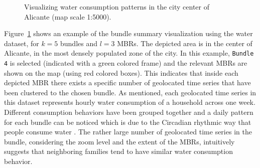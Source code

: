 \begin{figure}[ht]
 \centering
 \caption{Visualizing water consumption patterns in the city center of Alicante (map scale 1:5000).}
 \label{fig:alicante_example}
\end{figure}

Figure~\ref{fig:alicante_example} shows an example of the bundle summary visualization using the water dataset, for $k=5$ bundles and $l=3$ MBRs. The depicted area is in the center of Alicante, in the most densely populated zone of the city. In this example, \texttt{Bundle 4} is selected (indicated with a green colored frame) and the relevant MBRs are shown on the map (using red colored boxes). This indicates that inside each depicted MBR there exists a specific number of geolocated time series that have been clustered to the chosen bundle. As mentioned, each geolocated time series in this dataset represents hourly water consumption of a household across one week. Different consumption behaviors have been grouped together and a daily pattern for each bundle can be noticed which is due to the Circadian rhythmic way that people consume water \cite{aschoff1965circadian}. The rather large number of geolocated time series in the bundle, considering the zoom level and the extent of the MBRs, intuitively suggests that neighboring families tend to have similar water consumption behavior. 

